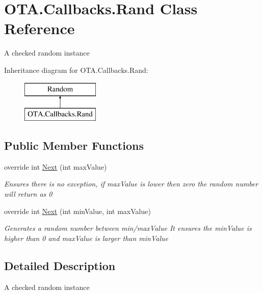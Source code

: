 \hypertarget{class_o_t_a_1_1_callbacks_1_1_rand}{}\section{O\+T\+A.\+Callbacks.\+Rand Class Reference}
\label{class_o_t_a_1_1_callbacks_1_1_rand}


A checked random instance  


Inheritance diagram for O\+T\+A.\+Callbacks.\+Rand\+:\begin{figure}[H]
\begin{center}
\leavevmode
\includegraphics[height=2.000000cm]{class_o_t_a_1_1_callbacks_1_1_rand}
\end{center}
\end{figure}
\subsection*{Public Member Functions}
\begin{DoxyCompactItemize}
\item 
override int \hyperlink{class_o_t_a_1_1_callbacks_1_1_rand_a44c48f599fd8891a1dc64aa0666c3a52}{Next} (int max\+Value)
\begin{DoxyCompactList}\small\item\em Ensures there is no exception, if max\+Value is lower then zero the random number will return as 0 \end{DoxyCompactList}\item 
override int \hyperlink{class_o_t_a_1_1_callbacks_1_1_rand_a7b588c8fcfa862d236662c809f92ad7f}{Next} (int min\+Value, int max\+Value)
\begin{DoxyCompactList}\small\item\em Generates a random number between min/max\+Value It ensures the min\+Value is higher than 0 and max\+Value is larger than min\+Value \end{DoxyCompactList}\end{DoxyCompactItemize}


\subsection{Detailed Description}
A checked random instance 

